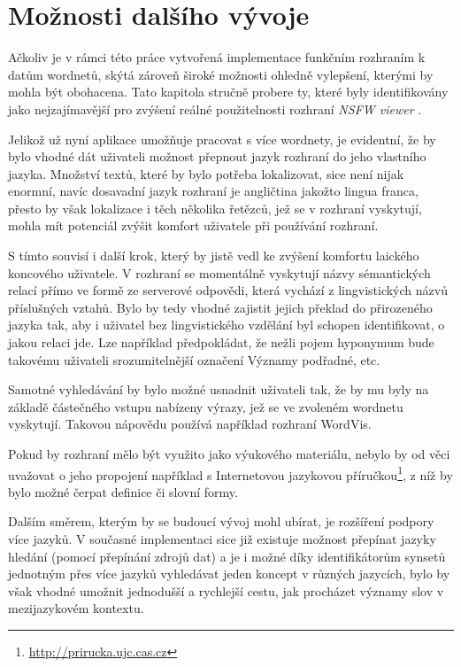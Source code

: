 \documentclass[a4paper, 11pt, oneside]{book}
\newcommand{\simplywn}{\textit{NSFW viewer} }
\newcommand\ex{\textsf}
\begin{document}
		\chapter{Možnosti dalšího vývoje}
		\label{cha:co-se-nestihlo}

			Ačkoliv je v rámci této práce vytvořená implementace funkčním rozhraním k datům wordnetů, skýtá zároveň široké možnosti ohledně vylepšení, kterými by mohla být obohacena. Tato kapitola stručně probere ty, které byly identifikovány jako nejzajímavější pro zvýšení reálné použitelnosti rozhraní \simplywn. 

			Jelikož už nyní aplikace umožňuje pracovat s více wordnety, je evidentní, že by bylo vhodné dát uživateli možnost přepnout jazyk rozhraní do jeho vlastního jazyka. Množství textů, které by bylo potřeba lokalizovat, sice není nijak enormní, navíc dosavadní jazyk rozhraní je angličtina jakožto lingua franca, přesto by však lokalizace i těch několika řetězců, jež se v rozhraní vyskytují, mohla mít potenciál zvýšit komfort uživatele při používání rozhraní.

			S tímto souvisí i další krok, který by jistě vedl ke zvýšení komfortu laického koncového uživatele. V rozhraní se momentálně vyskytují názvy sémantických relací přímo ve formě ze serverové odpovědi, která vychází z lingvistických názvů příslušných vztahů. Bylo by tedy vhodné zajistit jejich překlad do přirozeného jazyka tak, aby i uživatel bez lingvistického vzdělání byl schopen identifikovat, o jakou relaci jde. Lze například předpokládat, že nežli pojem \ex{hyponymum} bude takovému uživateli srozumitelnější označení \ex{Významy podřadné}, etc.

			Samotné vyhledávání by bylo možné usnadnit uživateli tak, že by mu byly na základě částečného vstupu nabízeny výrazy, jež se ve zvoleném wordnetu vyskytují. Takovou nápovědu používá například rozhraní WordVis. \parencite{wordvis2010vercruysse}

			Pokud by rozhraní mělo být využito jako výukového materiálu, nebylo by od věci uvažovat o jeho propojení například s Internetovou jazykovou příručkou\footnote{\url{http://prirucka.ujc.cas.cz}}, z níž by bylo možné čerpat definice či slovní formy.

			Dalším směrem, kterým by se budoucí vývoj mohl ubírat, je rozšíření podpory více jazyků. V současné implementaci sice již existuje možnost přepínat jazyky hledání (pomocí přepínání zdrojů dat) a je i možné díky identifikátorům synsetů jednotným přes více jazyků vyhledávat jeden koncept v různých jazycích, bylo by však vhodné umožnit jednodušší a rychlejší cestu, jak procházet významy slov v mezijazykovém kontextu.
\end{document}
